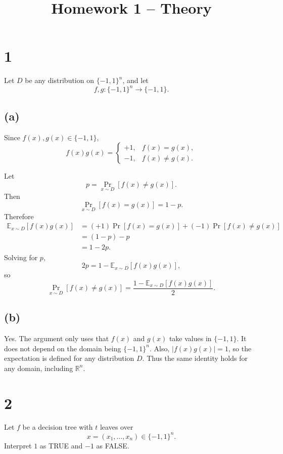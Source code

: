 \documentclass[11pt]{article}
\title{Homework 1 -- Theory}
\author{}
\date{}
\begin{document}
\maketitle

\section*{1}

Let \(D\) be any distribution on \(\{-1,1\}^n\), and let
\[
f,g:\{-1,1\}^n\to\{-1,1\}.
\]

\subsection*{(a)}

Since \(f(x),g(x)\in\{-1,1\}\),
\[
f(x)g(x)
=
\begin{cases}
+1, & f(x)=g(x),\\
-1, & f(x)\neq g(x).
\end{cases}
\]

Let
\[
p=\Pr_{x\sim D}[f(x)\neq g(x)].
\]
Then
\[
\Pr_{x\sim D}[f(x)=g(x)]=1-p.
\]
Therefore
\begin{align*}
\mathbb{E}_{x\sim D}[f(x)g(x)]
&=(+1)\Pr[f(x)=g(x)]+(-1)\Pr[f(x)\neq g(x)]\\
&=(1-p)-p\\
&=1-2p.
\end{align*}
Solving for \(p\),
\[
2p=1-\mathbb{E}_{x\sim D}[f(x)g(x)],
\]
so
\[
\boxed{
\Pr_{x\sim D}[f(x)\neq g(x)]
=
\frac{1-\mathbb{E}_{x\sim D}[f(x)g(x)]}{2}.
}
\]

\subsection*{(b)}

Yes. The argument only uses that \(f(x)\) and \(g(x)\) take values in
\(\{-1,1\}\). It does not depend on the domain being \(\{-1,1\}^n\).
Also, \(|f(x)g(x)|=1\), so the expectation is defined for any distribution
\(D\). Thus the same identity holds for any domain, including
\(\mathbb{R}^n\).

\section*{2}

Let \(f\) be a decision tree with \(t\) leaves over
\[
x=(x_1,\ldots,x_n)\in\{-1,1\}^n.
\]
Interpret \(1\) as TRUE and \(-1\) as FALSE.
\end{document}
